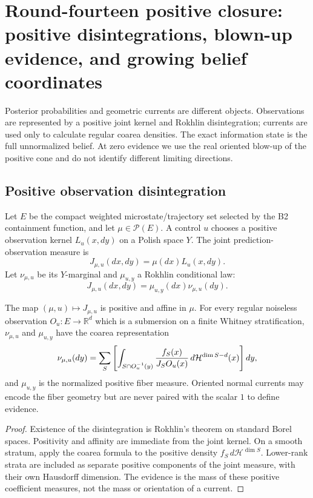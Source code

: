 
\section{Round-fourteen positive closure: positive disintegrations, blown-up evidence, and growing belief coordinates}
\label{sec:r14-c1}

Posterior probabilities and geometric currents are different objects.
Observations are represented by a positive joint kernel and Rokhlin
disintegration; currents are used only to calculate regular coarea densities.
The exact information state is the full unnormalized belief.  At zero evidence
we use the real oriented blow-up of the positive cone and do not identify
different limiting directions.

\subsection{Positive observation disintegration}

Let \(E\) be the compact weighted microstate/trajectory set selected by the
B2 containment function, and let \(\mu\in\mathcal P(E)\).  A control \(u\)
chooses a positive observation kernel \(L_u(x,dy)\) on a Polish space \(Y\).
The joint prediction-observation measure is
\[
 J_{\mu,u}(dx,dy)=\mu(dx)L_u(x,dy).
\]
Let \(\nu_{\mu,u}\) be its \(Y\)-marginal and
\(\mu_{u,y}\) a Rokhlin conditional law:
\[
 J_{\mu,u}(dx,dy)=\mu_{u,y}(dx)\nu_{\mu,u}(dy).
\]

\begin{theorem}
\label{thm:r14-c1-posterior}
The map \((\mu,u)\mapsto J_{\mu,u}\) is positive and affine in \(\mu\).
For every regular noiseless observation
\(O_u:E\to\mathbb R^d\) which is a submersion on a finite Whitney
stratification, \(\nu_{\mu,u}\) and \(\mu_{u,y}\) have the coarea
representation
\[
 \nu_{\mu,u}(dy)
 =
 \sum_S\left[
 \int_{S\cap O_u^{-1}(y)}
 {f_S(x)\over J_SO_u(x)}\,d\mathcal H^{\dim S-d}(x)
 \right]dy,
\]
and \(\mu_{u,y}\) is the normalized positive fiber measure.  Oriented normal
currents may encode the fiber geometry but are never paired with the scalar
\(1\) to define evidence.
\end{theorem}

\begin{proof}
Existence of the disintegration is Rokhlin's theorem on standard Borel
spaces.  Positivity and affinity are immediate from the joint kernel.
On a smooth stratum, apply the coarea formula to the positive density
\(f_S\,d\mathcal H^{\dim S}\).  Lower-rank strata are included as separate
positive components of the joint measure, with their own Hausdorff dimension.
The evidence is the mass of these positive coefficient measures, not the mass
or orientation of a current.
\end{proof}

